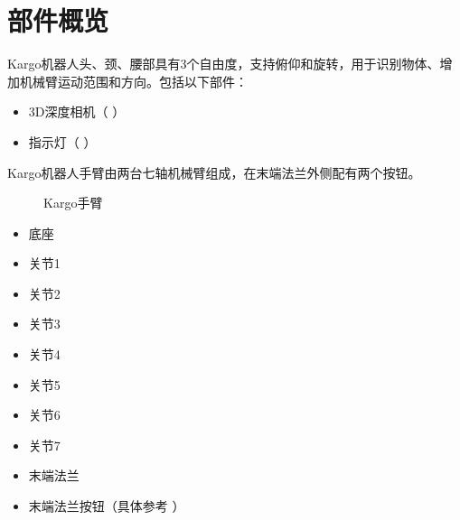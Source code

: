 \documentclass[a4paper,11pt,english,openany,oneside]{sphinxmanual}
\begin{document}
\section{部件概览}
\label{\detokenize{06 _u7cfb_u7edf_u6982_u8ff0:id5}}\label{\detokenize{06 _u7cfb_u7edf_u6982_u8ff0:id6}}
\sphinxAtStartPar
Kargo机器人头、颈、腰部具有3个自由度，支持俯仰和旋转，用于识别物体、增加机械臂运动范围和方向。包括以下部件：
\begin{itemize}
\item {} 
\sphinxAtStartPar
3D深度相机（ {\hyperref[\detokenize{07 _u6280_u672f_u89c4_u683c:d}]{}} ）

\item {} 
\sphinxAtStartPar
指示灯（ {\hyperref[\detokenize{07 _u6280_u672f_u89c4_u683c:id18}]{}} ）

\end{itemize}

\sphinxAtStartPar
Kargo机器人手臂由两台七轴机械臂组成，在末端法兰外侧配有两个按钮。

\begin{figure}[H]
\centering
\capstart

\noindent{}
\caption{Kargo手臂}\label{\detokenize{06 _u7cfb_u7edf_u6982_u8ff0:id8}}\end{figure}
\begin{itemize}
\item {} 
\sphinxAtStartPar
{} 底座

\item {} 
\sphinxAtStartPar
{} 关节1

\item {} 
\sphinxAtStartPar
{} 关节2

\item {} 
\sphinxAtStartPar
{} 关节3

\item {} 
\sphinxAtStartPar
{} 关节4

\item {} 
\sphinxAtStartPar
{} 关节5

\item {} 
\sphinxAtStartPar
{} 关节6

\item {} 
\sphinxAtStartPar
{} 关节7

\item {} 
\sphinxAtStartPar
{} 末端法兰

\item {} 
\sphinxAtStartPar
{} 末端法兰按钮（具体参考 {\hyperref[\detokenize{07 _u6280_u672f_u89c4_u683c:id26}]{}} ）

\end{itemize}
\end{document}
